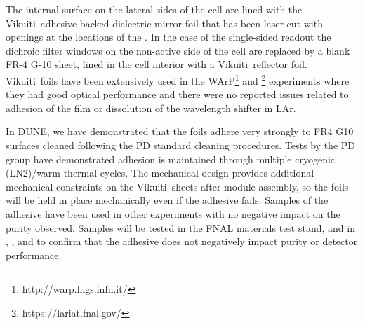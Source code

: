 

The  internal surface on the lateral sides of the cell are lined with the Vikuiti\texttrademark\ adhesive-backed dielectric mirror foil
that has been laser cut with openings at the locations of the .  In the case of the single-sided readout the dichroic filter windows on the non-active side of the cell are replaced by a blank FR-4 G-10 sheet, lined in the cell interior with a Vikuiti\texttrademark\ reflector foil.
Vikuiti\texttrademark\ foils have been extensively used in the WArP\footnote{http://warp.lngs.infn.it/} and \footnote{https://lariat.fnal.gov/} experiments where they had good optical performance and there were no reported issues related to adhesion of the film or dissolution of the wavelength shifter in LAr.

In DUNE, we have demonstrated that the foils adhere very strongly to FR4 G10 surfaces cleaned following the PD standard cleaning procedures.  Tests by the PD group have demonstrated adhesion is maintained through multiple cryogenic (LN2)/warm thermal cycles.  The mechanical design provides additional mechanical constraints on the Vikuiti\texttrademark\ sheets after module assembly, so the foils will be held in place mechanically even if the adhesive fails.  Samples of the adhesive have been used in other experiments with no negative impact on the  purity observed.  Samples will be tested in the FNAL materials test stand, and in , , and  to confirm that the adhesive does not negatively impact  purity or detector performance.


